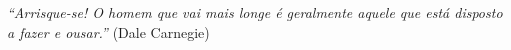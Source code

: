 \begin{epigrafe}
    \vspace*{\fill}
	\begin{flushright}
		\textit{“Arrisque-se!
O homem que vai mais longe é geralmente aquele que 
está disposto a fazer e ousar.”} (Dale Carnegie)
	\end{flushright}
\end{epigrafe}
